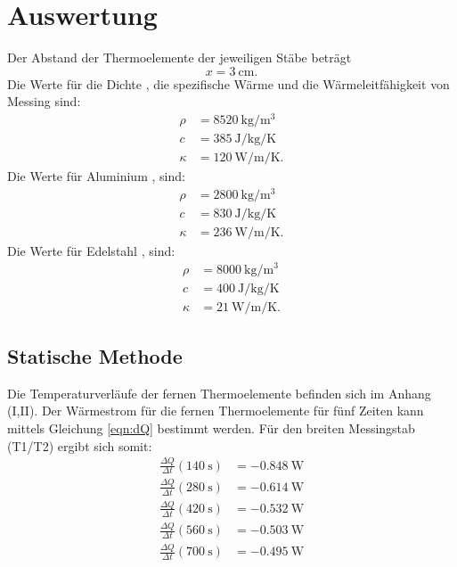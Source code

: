 \section{Auswertung}
\label{sec:Auswertung}
Der Abstand der Thermoelemente der jeweiligen Stäbe beträgt
\begin{equation*}
    x = \SI{3}{\centi\meter}.
\end{equation*}
Die Werte für die Dichte \cite{V204}, die spezifische Wärme \cite{V204} und 
die Wärmeleitfähigkeit \cite{wiki} von Messing sind: 
\begin{align*}
    \rho &= \SI{8520}{\kilo\gram\per\cubic\meter} \\
    c &= \SI{385}{\joule\per\kilo\gram\per\kelvin} \\
    \kappa &= \SI{120}{\watt\per\meter\per\kelvin}.
\end{align*}
Die Werte für Aluminium \cite{V204}, \cite{wiki} sind:
\begin{align*}
    \rho &= \SI{2800}{\kilo\gram\per\cubic\meter} \\
    c &= \SI{830}{\joule\per\kilo\gram\per\kelvin} \\
    \kappa &= \SI{236}{\watt\per\meter\per\kelvin}.
\end{align*}
Die Werte für Edelstahl \cite{V204}, \cite{edelstahl} sind:
\begin{align*}
    \rho &= \SI{8000}{\kilo\gram\per\cubic\meter} \\
    c &= \SI{400}{\joule\per\kilo\gram\per\kelvin} \\
    \kappa &= \SI{21}{\watt\per\meter\per\kelvin}.
\end{align*}

\subsection{Statische Methode}
Die Temperaturverläufe der fernen Thermoelemente
befinden sich im Anhang (I,II).
\newline
Der Wärmestrom für die fernen Thermoelemente für fünf Zeiten kann mittels
Gleichung \ref{eqn:dQ} bestimmt werden.
Für den breiten Messingstab (T1/T2) ergibt sich somit:
\begin{align*} %
   \frac{\Delta Q}{\Delta t}(\SI{140}{\second}) &= \SI{-0.848}{\watt} \\ 
   \frac{\Delta Q}{\Delta t}(\SI{280}{\second}) &= \SI{-0.614}{\watt} \\ 
   \frac{\Delta Q}{\Delta t}(\SI{420}{\second}) &= \SI{-0.532}{\watt} \\ 
   \frac{\Delta Q}{\Delta t}(\SI{560}{\second}) &= \SI{-0.503}{\watt} \\ 
   \frac{\Delta Q}{\Delta t}(\SI{700}{\second}) &= \SI{-0.495}{\watt} \\ 
\end{align*}

